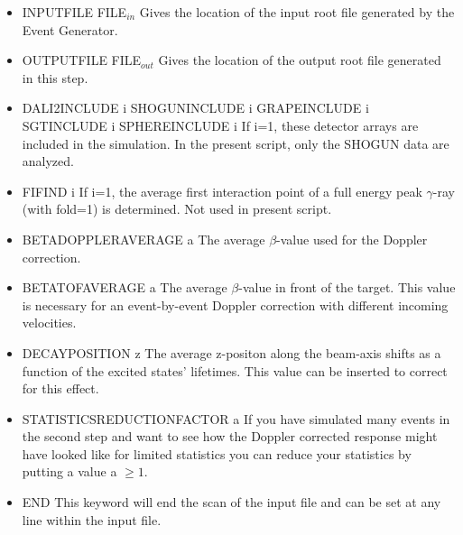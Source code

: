 \documentclass[12pt]{book}
\begin{document}
\begin{itemize}
\item INPUTFILE FILE$_{in}$ \hfill{} \linebreak
  Gives the location of the input root file generated by the Event Generator.
\item OUTPUTFILE FILE$_{out}$ \hfill{} \linebreak
  Gives the location of the output root file generated in this step.
\item DALI2INCLUDE i\hfill{} \linebreak
  SHOGUNINCLUDE i\hfill{} \linebreak
  GRAPEINCLUDE i\hfill{} \linebreak
  SGTINCLUDE i\hfill{} \linebreak
  SPHEREINCLUDE i\hfill{} \linebreak
  If i=1, these detector arrays are included in the simulation. 
  In the present script, only the SHOGUN data are analyzed.
\item FIFIND i\hfill{} \linebreak
  If i=1, the average first interaction point of a full energy peak $\gamma$-ray (with fold=1) is determined.
  Not used in present script.
\item BETADOPPLERAVERAGE a \hfill{} \linebreak
  The average $\beta$-value used for the Doppler correction.
\item BETATOFAVERAGE a \hfill{} \linebreak
  The average $\beta$-value in front of the target. This value is necessary for an event-by-event
  Doppler correction with different incoming velocities.
\item DECAYPOSITION z\hfill{} \linebreak
  The average z-positon along the beam-axis shifts as a function of the excited states' lifetimes. This
  value can be inserted to correct for this effect.
\item STATISTICSREDUCTIONFACTOR a\hfill{} \linebreak
  If you have simulated many events in the second step and want to see how the Doppler corrected response might
  have looked like for limited statistics you can reduce your statistics by putting a value a $\ge 1$.
\item END  \hfill{} \linebreak
  This keyword will end the scan of the input file and can be set at any line within the input file.
\end{itemize}
\end{document}
